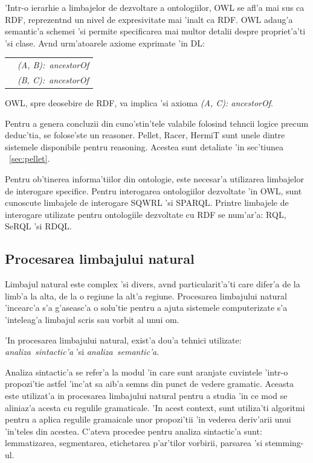 \documentclass[12pt,a4paper,twoside]{report}
\begin{document}
'Intr-o ierarhie a limbajelor de dezvoltare a ontologiilor, OWL se afl'a mai sus ca RDF, reprezent\ia nd un nivel de expresivitate mai 'inalt ca RDF. OWL adaug'a semantic'a schemei 'si permite specificarea mai multor detalii despre propriet'a'ti 'si clase. Av\ia nd urm'atoarele axiome exprimate 'in DL:

\begin{tabular}{ll}
          &  {\it (A, B):\ ancestorOf}\\
          &  {\it (B, C):\ ancestorOf}\\
\end{tabular}

OWL, spre deosebire de RDF, va implica 'si axioma {\it (A, C): ancestorOf}. 

Pentru a genera concluzii din cuno'stin'tele valabile folosind tehncii logice precum deduc'tia, se folose'ste un reasoner. Pellet, Racer, HermiT sunt unele dintre sistemele disponibile pentru reasoning. Acestea sunt detaliate 'in sec'tiunea ~\ref{sec:pellet}.

Pentru ob'tinerea informa'tiilor din ontologie, este necesar'a utilizarea limbajelor de interogare specifice. Pentru interogarea ontologiilor dezvoltate 'in OWL, sunt cunoscute limbajele de interogare SQWRL 'si SPARQL. Printre limbajele de interogare utilizate pentru ontologiile dezvoltate cu RDF se num'ar'a: RQL, SeRQL 'si RDQL.



\subsection{Procesarea limbajului natural}

Limbajul natural este complex 'si divers, av\ia nd particularit'a'ti care difer'a de la limb'a la alta, de la o regiune la alt'a regiune. Procesarea limbajului natural 'incearc'a s'a g'aseasc'a o solu'tie pentru a ajuta sistemele computerizate s'a 'inteleag'a limbajul scris sau vorbit al unui om. 

'In procesarea limbajului natural, exist'a dou'a tehnici utilizate: {\it analiza\ sintactic'a} 'si {\it analiza\ semantic'a}.

Analiza sintactic'a se refer'a la modul 'in care sunt aranjate cuvintele 'intr-o propozi'tie astfel 'inc'at sa aib'a semns din punct de vedere gramatic. Aceasta este utilizat'a in procesarea limbajului natural pentru a studia 'in ce mod se aliniaz'a acesta cu regulile gramaticale. 'In acest context, sunt utiliza'ti algoritmi pentru a aplica regulile gramaicale unor propozi'tii 'in vederea deriv'arii unui 'in'teles din acestea. C'ateva procedee pentru analiza sintactic'a sunt: lemmatizarea, segmentarea, etichetarea p'ar'tilor vorbirii, parsarea 'si stemming-ul.
\end{document}
